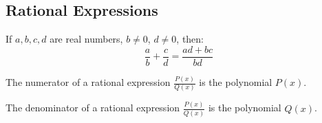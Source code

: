\documentclass[../main.tex]{subfiles}
\begin{document}
\subsection{Rational Expressions}
%
\begin{theorem}
\label{theorem:north_shore_cross_multiplying}
If $a,b,c,d$ are real numbers, $b\ne 0$, $d\ne 0$, then:
\begin{equation*}
    \frac{a}{b} +\frac{c}{d} = \frac{ad+bc}{bd}
\end{equation*}
\end{theorem}
%
\begin{definition}
\label{definition:north_shore_numerator_of_rational_expression}
The numerator of a rational expression $\frac{P(x)}{Q(x)}$ is the polynomial $P(x)$.
\end{definition}
%
\begin{definition}
\label{definition:north_shore_denominator_of_rational_expression}
The denominator of a rational expression $\frac{P(x)}{Q(x)}$ is the polynomial $Q(x)$.
\end{definition}
%
\end{document}
